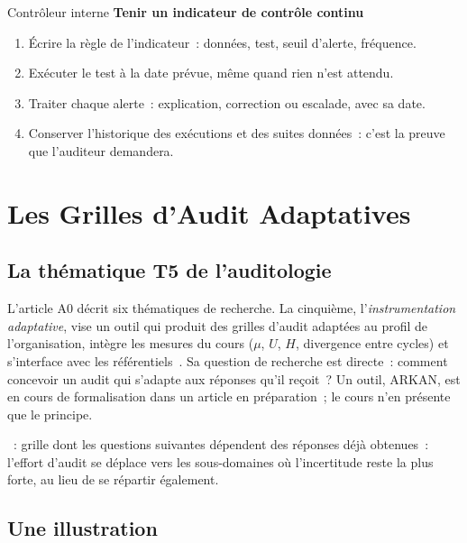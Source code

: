 \begin{boxmetier}{Contrôleur interne}
\textbf{Tenir un indicateur de contrôle continu}
\begin{enumerate}
    \item Écrire la règle de l'indicateur~: données, test, seuil d'alerte,
          fréquence.
    \item Exécuter le test à la date prévue, même quand rien n'est attendu.
    \item Traiter chaque alerte~: explication, correction ou escalade, avec
          sa date.
    \item Conserver l'historique des exécutions et des suites données~:
          c'est la preuve que l'auditeur demandera.
\end{enumerate}
\end{boxmetier}

\section{Les Grilles d'Audit Adaptatives}
\label{sec:c19-adaptatif}

\subsection{La thématique T5 de l'auditologie}

L'article A0 décrit six thématiques de recherche. La cinquième,
l'\emph{instrumentation adaptative}, vise un outil qui produit des grilles
d'audit adaptées au profil de l'organisation, intègre les mesures du
cours ($\mu$, $U$, $H$, divergence entre cycles) et s'interface avec les
référentiels~\cite{minka2026auditologie}. Sa question de recherche est
directe~: comment concevoir un audit qui s'adapte aux réponses qu'il
reçoit~? Un outil, ARKAN, est en cours de formalisation dans un article
en préparation~; le cours n'en présente que le principe.

\begin{boxdef}
~: grille dont les
questions suivantes dépendent des réponses déjà obtenues~: l'effort
d'audit se déplace vers les sous-domaines où l'incertitude reste la plus
forte, au lieu de se répartir également.
\end{boxdef}

\subsection{Une illustration}

